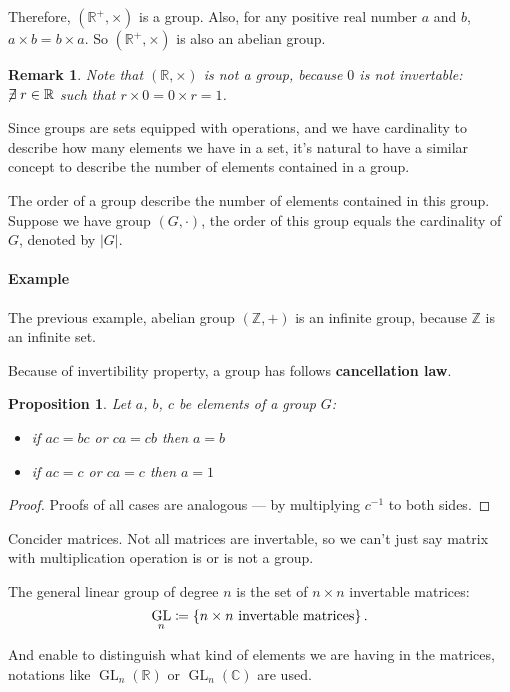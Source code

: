 \documentclass[UTF8]{ctexart}
\theoremstyle{mystyle}
\newtheorem{proposition}{Proposition}[section]
\theoremstyle{myremark}
\newtheorem*{remark}{Remark}
\theoremstyle{plain}
\newcommand{\R}{\mathbb R}
\newcommand{\Z}{\mathbb Z}
\newcommand{\C}{\mathbb C}
\DeclareMathOperator{\GL}{GL}
\DeclarePairedDelimiter\set{\{}{\}}
\begin{document}
Therefore, $ (\R^+, \times) $ is a group. Also, for any positive real number $ a $ and $ b $, $ a \times b = b \times a $. So $ (\R^+, \times) $ is also an abelian group.


\begin{remark}
    Note that $ (\R, \times) $ is not a group, because $ 0 $ is not invertable: $ \centernot\exists r \in \R $ such that $ r \times 0 = 0 \times r = 1 $.
\end{remark}

Since groups are sets equipped with operations, and we have cardinality to describe how many elements we have in a set, it's natural to have a similar concept to describe the number of elements contained in a group.

\begin{definition}
    The order of a group describe the number of elements contained in this group. Suppose we have group $ (G, \cdot) $, the order of this group equals the cardinality of $ G $, denoted by $ |G| $.
\end{definition}

\paragraph{Example}
The previous example, abelian group $ (\Z, +) $ is an infinite group, because $ \Z $ is an infinite set.

Because of invertibility property, a group has follows \textbf{cancellation law}.

\begin{proposition}
    Let $ a $, $ b $, $ c $ be elements of a group $ G $: 
    \begin{itemize}
        \item if $ ac = bc $ or $ ca = cb $ then $ a = b $
        \item if $ ac = c $ or $ ca = c $ then $ a = 1 $
    \end{itemize}
\end{proposition}

\begin{proof}
    Proofs of all cases are analogous --- by multiplying $ c^{-1} $ to both sides.
\end{proof}

Concider matrices. Not all matrices are invertable, so we can't just say matrix with multiplication operation is or is not a group.

\begin{definition}
    The general linear group of degree $ n $ is the set of $ n \times n $ invertable matrices:
    \[ \GL_n \coloneqq \set{n \times n \text{ invertable matrices}} \,.\]

    And enable to distinguish what kind of elements we are having in the matrices, notations like $ \GL_n(\R) $ or $ \GL_n(\C) $ are used.
\end{definition}
\end{document}
